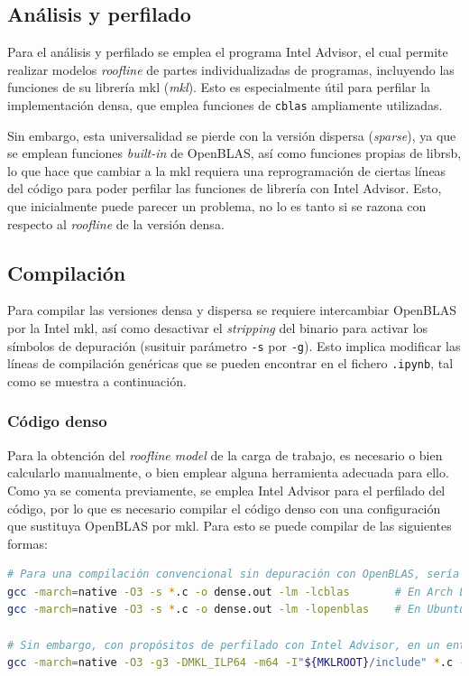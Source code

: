 \subsection{Análisis y perfilado}
\label{ssec:analisis_perfilado_metodologia}
Para el análisis y perfilado se emplea el programa Intel Advisor, el cual permite realizar modelos \textit{roofline} de partes individualizadas de programas, incluyendo las funciones de su librería \acrshort{mkl} (\textit{\acrlong{mkl}}). Esto es especialmente útil para perfilar la implementación densa, que emplea funciones de \texttt{cblas} ampliamente utilizadas.

Sin embargo, esta universalidad se pierde con la versión dispersa (\textit{sparse}), ya que se emplean funciones \textit{built-in} de OpenBLAS, así como funciones propias de librsb, lo que hace que cambiar a la \acrshort{mkl} requiera una reprogramación de ciertas líneas del código para poder perfilar las funciones de librería con Intel Advisor. Esto, que inicialmente puede parecer un problema, no lo es tanto si se razona con respecto al \textit{roofline} de la versión densa.

\subsection{Compilación}
\label{ssec:compilacion_metodologia}
Para compilar las versiones densa y dispersa se requiere intercambiar OpenBLAS por la Intel \acrshort{mkl}, así como desactivar el \textit{stripping} del binario para activar los símbolos de depuración (susituir parámetro \texttt{-s} por \texttt{-g}). Esto implica modificar las líneas de compilación genéricas que se pueden encontrar en el fichero \texttt{.ipynb}, tal como se muestra a continuación.

\subsubsection{Código denso}
Para la obtención del \textit{roofline model} de la carga de trabajo, es necesario o bien calcularlo manualmente, o bien emplear alguna herramienta adecuada para ello. Como ya se comenta previamente, se emplea Intel Advisor para el perfilado del código, por lo que es necesario compilar el código denso con una configuración que sustituya OpenBLAS por \acrshort{mkl}. Para esto se puede compilar de las siguientes formas:\medskip
\begin{lstlisting}[language=bash]
# Para una compilación convencional sin depuración con OpenBLAS, sería necesario únicamente ejecutar
gcc -march=native -O3 -s *.c -o dense.out -lm -lcblas       # En Arch Linux
gcc -march=native -O3 -s *.c -o dense.out -lm -lopenblas    # En Ubuntu

# Sin embargo, con propósitos de perfilado con Intel Advisor, en un entorno bash donde se haya realizado `source /opt/intel/oneapi/setvar.sh` se ha de compilar con:
gcc -march=native -O3 -g3 -DMKL_ILP64 -m64 -I"${MKLROOT}/include" *.c -o dense.out -L${MKLROOT}/lib/intel64 -Wl,--no-as-needed -lmkl_intel_ilp64 -lmkl_gnu_thread -lmkl_core -lgomp -lpthread -lm -ldl
\end{lstlisting}


